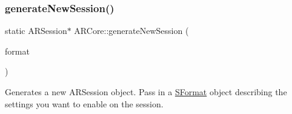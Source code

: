 \subsubsection{\texorpdfstring{generate\+New\+Session()}{generateNewSession()}}
{\footnotesize\ttfamily static A\+R\+Session$\ast$ A\+R\+Core\+::generate\+New\+Session (\begin{DoxyParamCaption}\item[{\mbox{\hyperlink{class_a_r_core_1_1_s_format}{S\+Format}}}]{format }\end{DoxyParamCaption})\hspace{0.3cm}{\ttfamily [static]}}

Generates a new A\+R\+Session object. Pass in a \mbox{\hyperlink{class_a_r_core_1_1_s_format}{S\+Format}} object describing the settings you want to enable on the session. 